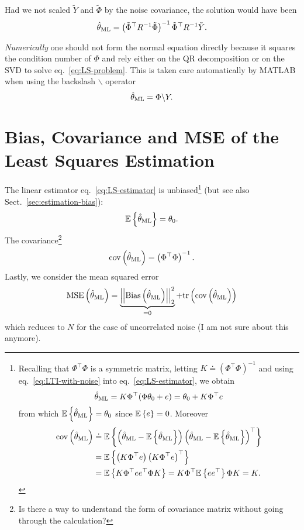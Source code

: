 Had we not scaled $\tilde{Y}$ and $\tilde{\Phi}$ by the noise covariance, the solution would have been
\begin{equation*}
  \hat{\theta}_\textrm{ML} = \left(\tilde{\Phi}^\top R^{-1}\tilde{\Phi}\right)^{-1} \tilde{\Phi}^\top R^{-1} \tilde{Y}.
\end{equation*}

\emph{Numerically} one should not form the normal equation directly because it squares the condition number of $\Phi$ and rely either on the QR decomposition or on the SVD to solve eq.~\eqref{eq:LS-problem}.
This is taken care automatically by MATLAB when using the backslash $\backslash$ operator
\begin{equation}
  \label{eq:LS-numerical-solution}
  \hat{\theta}_\textrm{ML} = \Phi \backslash Y.
\end{equation}

\section{Bias, Covariance and MSE of the Least Squares Estimation}
\label{sec:bias-variance-MSE-LS-estimation}

The linear estimator eq.~\eqref{eq:LS-estimator} is unbiased\footnote{Recalling that $\Phi^\top \Phi$ is a symmetric matrix, letting $K\doteq (\Phi^\top \Phi)^{-1}$ and using eq.~\eqref{eq:LTI-with-noise} into eq.~\eqref{eq:LS-estimator}, we obtain
  \begin{equation}
    \label{eq:thetaLS-estimate}
    \hat{\theta}_\textrm{ML} = K\Phi^\top (\Phi\theta_0 + e) = \theta_0 + K\Phi^\top e
  \end{equation}
  from which $\mathbb{E}\left\{\hat{\theta}_\textrm{ML}\right\} = \theta_0$ since $\mathbb{E}\left\{e\right\}=0$. Moreover
  \begin{align*}
    \textrm{cov}\left(\hat{\theta}_\textrm{ML}\right) &\doteq \mathbb{E}\left\{\left(\hat{\theta}_\textrm{ML} - \mathbb{E}\left\{\hat{\theta}_\textrm{ML}\right\}\right) \left(\hat{\theta}_\textrm{ML} - \mathbb{E}\left\{\hat{\theta}_\textrm{ML}\right\}\right)^\top\right\} \\
                   &= \mathbb{E}\left\{\left(K \Phi^\top e\right) \left(K \Phi^\top e\right)^\top\right\} \\
                   &= \mathbb{E}\left\{K \Phi^\top e e^\top \Phi K\right\} = K \Phi^\top \mathbb{E}\left\{ee^\top\right\} \Phi K = K.
  \end{align*}} (but see also Sect.~\ref{sec:estimation-bias}):
\begin{equation*}
  \mathbb{E}\left\{\hat{\theta}_\textrm{ML}\right\} = \theta_0.
\end{equation*}
The covariance\footnote{Is there a way to understand the form of covariance matrix without going through the calculation?}
\begin{equation}
  \label{eq:covariance-LS}
  \textrm{cov}\left(\hat{\theta}_\textrm{ML}\right) = \left(\Phi^\top \Phi\right)^{-1}.
\end{equation}
Lastly, we consider the mean squared error
\begin{equation*}
  \textrm{MSE}\left(\hat{\theta}_\textrm{ML}\right) = \underbrace{\left|\left|\textrm{Bias}\left(\hat{\theta}_\textrm{ML}\right)\right|\right|_2^2}_{=0} + \textrm{tr}\left(\textrm{cov}\left(\hat{\theta}_\textrm{ML}\right)\right)
\end{equation*}
which reduces to $N$ for the case of uncorrelated noise (I am not sure about this anymore).

